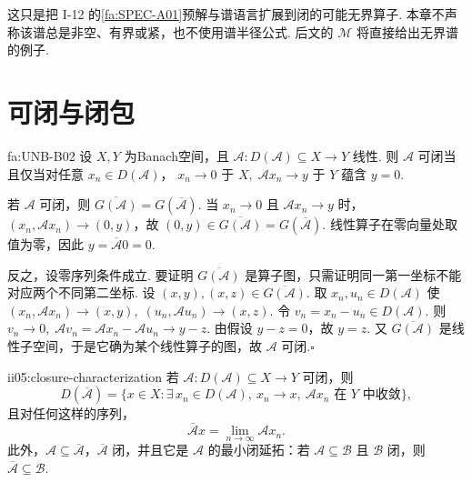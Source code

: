 这只是把 I-12 的\autoref{fa:SPEC-A01}预解与谱语言扩展到闭的可能无界算子. 本章不声称该谱总是非空、有界或紧，也不使用谱半径公式. 后文的 \(\displaystyle\mathcal M\) 将直接给出无界谱的例子.

\section{可闭与闭包}\label{sec:ii05-closable-closure}

\begin{FATheorem}[B][可闭性的零序列判据]{fa:UNB-B02}
设 \(\displaystyle X,Y\) 为Banach空间，且 \(\displaystyle\mathcal A:D(\mathcal A)\subseteq X\to Y\) 线性. 则 \(\displaystyle\mathcal A\) 可闭当且仅当对任意 \(\displaystyle x_n\in D(\mathcal A)\)，
\(\displaystyle x_n\to0\text{ 于 }X, \; \mathcal Ax_n\to y\text{ 于 }Y\)
蕴含 \(\displaystyle y=0\).
\end{FATheorem}

\begin{FAProof}
若 \(\displaystyle\mathcal A\) 可闭，则
\(\displaystyle \overline{G(\mathcal A)}=G(\overline{\mathcal A}).\)
当 \(\displaystyle x_n\to0\) 且 \(\displaystyle\mathcal Ax_n\to y\) 时，\(\displaystyle(x_n,\mathcal Ax_n)\to(0,y)\)，故
\(\displaystyle (0,y)\in\overline{G(\mathcal A)}=G(\overline{\mathcal A}).\)
线性算子在零向量处取值为零，因此 \(\displaystyle y=\overline{\mathcal A}0=0\).

反之，设零序列条件成立. 要证明 \(\displaystyle\overline{G(\mathcal A)}\) 是算子图，只需证明同一第一坐标不能对应两个不同第二坐标. 设
\(\displaystyle (x,y),(x,z)\in\overline{G(\mathcal A)}.\)
取 \(\displaystyle x_n,u_n\in D(\mathcal A)\) 使
\(\displaystyle (x_n,\mathcal Ax_n)\to(x,y), \; (u_n,\mathcal Au_n)\to(x,z).\)
令 \(\displaystyle v_n=x_n-u_n\in D(\mathcal A)\). 则
\(\displaystyle v_n\to0, \; \mathcal Av_n=\mathcal Ax_n-\mathcal Au_n\to y-z.\)
由假设 \(\displaystyle y-z=0\)，故 \(\displaystyle y=z\). 又 \(\displaystyle\overline{G(\mathcal A)}\) 是线性子空间，于是它确为某个线性算子的图，故 \(\displaystyle\mathcal A\) 可闭.\hfill\(\square\)
\end{FAProof}

\begin{FAProposition}[B][闭包的序列刻画与最小闭延拓]{ii05:closure-characterization}
若 \(\displaystyle\mathcal A:D(\mathcal A)\subseteq X\to Y\) 可闭，则
\[
D(\overline{\mathcal A})
=
\{x\in X:\exists\,x_n\in D(\mathcal A),\ x_n\to x,\ \mathcal Ax_n\text{ 在 }Y\text{ 中收敛}\},
\]
且对任何这样的序列，
\[
\overline{\mathcal A}x=\lim_{n\to\infty}\mathcal Ax_n.
\]
此外，\(\displaystyle\mathcal A\subseteq\overline{\mathcal A}\)，\(\displaystyle\overline{\mathcal A}\) 闭，并且它是 \(\displaystyle\mathcal A\) 的最小闭延拓：若 \(\displaystyle\mathcal A\subseteq\mathcal B\) 且 \(\displaystyle\mathcal B\) 闭，则 \(\displaystyle\overline{\mathcal A}\subseteq\mathcal B\).
\end{FAProposition}

